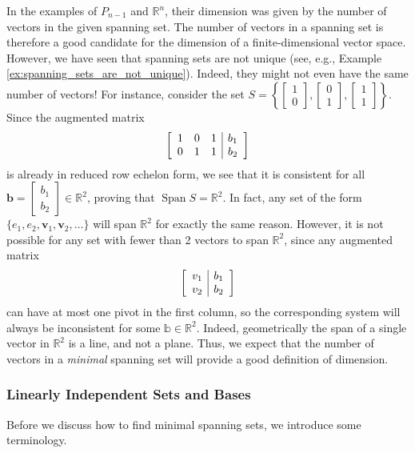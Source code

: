 \documentclass[12pt,letterpaper,reqno]{article}
\numberwithin{equation}{section}
\newcommand{\R}{\ensuremath{\mathbb R}}
\DeclareMathOperator{\Span}{Span}
\begin{document}
In the examples of $P_{n-1}$ and $\R^n$, their dimension was given by the number of vectors in the given spanning set. The number of vectors in a spanning set is therefore a good candidate for the dimension of a finite-dimensional vector space. However, we have seen that spanning sets are not unique (see, e.g., Example \ref{ex:spanning_sets_are_not_unique}). Indeed, they might not even have the same number of vectors! For instance, consider the set $S=\left\{\begin{bmatrix}
	1 \\ 0
\end{bmatrix}, \begin{bmatrix}
	0 \\ 1
\end{bmatrix}, \begin{bmatrix}
	1 \\ 1
\end{bmatrix}\right\}$. Since the augmented matrix
\begin{align*}
	\left[\begin{array}{c c c| c}
		1 & 0 & 1 & b_1 \\
		0 & 1 & 1 & b_2
	\end{array}\right]
\end{align*}
is already in reduced row echelon form, we see that it is consistent for all $\mathbf{b}=\begin{bmatrix}
	b_1 \\ b_2
\end{bmatrix} \in \R^2$, proving that $\Span S=\R^2$. In fact, any set of the form $\{e_1,e_2,\mathbf{v}_1,\mathbf{v}_2,\dots\}$ will span $\R^2$ for exactly the same reason. However, it is not possible for any set with fewer than 2 vectors to span $\R^2$, since any augmented matrix
\begin{align*}
	\left[\begin{array}{c | c}
		v_1 & b_1 \\
		v_2 & b_2
	\end{array}\right]
\end{align*}
can have at most one pivot in the first column, so the corresponding system will always be inconsistent for some $\mathbb{b} \in \R^2$. Indeed, geometrically the span of a single vector in $\R^2$ is a line, and not a plane. Thus, we expect that the number of vectors in a \emph{minimal} spanning set will provide a good definition of dimension.

\subsubsection{Linearly Independent Sets and Bases}
Before we discuss how to find minimal spanning sets, we introduce some terminology.
\end{document}

